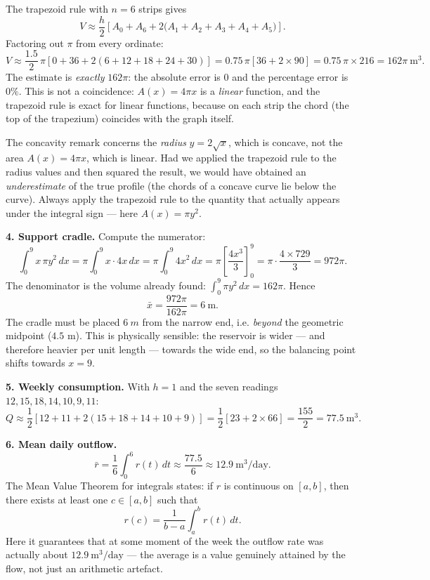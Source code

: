 \documentclass[11pt]{article}
\newcommand{\cle}[1]{{\popxbold\color{popdark}#1}}
\begin{document}
The trapezoid rule with $n=6$ strips gives
\[
V\approx \frac{h}{2}\left[A_0+A_6+2\big(A_1+A_2+A_3+A_4+A_5\big)\right].
\]
Factoring out $\pi$ from every ordinate:
\[
V\approx \frac{1.5}{2}\,\pi\left[0+36+2(6+12+18+24+30)\right]
=0.75\,\pi\left[36+2\times 90\right]
=0.75\,\pi\times 216
=162\pi\ \mathrm{m^3}.
\]
The estimate is \emph{exactly} $162\pi$: the absolute error is $0$ and the percentage error is $0\%$. This is not a coincidence: $A(x)=4\pi x$ is a \emph{linear} function, and the trapezoid rule is exact for linear functions, because on each strip the chord (the top of the trapezium) coincides with the graph itself.

\begin{attention}
The concavity remark concerns the \emph{radius} $y=2\sqrt{x}$, which is concave, not the area $A(x)=4\pi x$, which is linear. Had we applied the trapezoid rule to the radius values and then squared the result, we would have obtained an \emph{underestimate} of the true profile (the chords of a concave curve lie below the curve). Always apply the trapezoid rule to the quantity that actually appears under the integral sign — here $A(x)=\pi y^2$.
\end{attention}

\textbf{4. Support cradle.} Compute the numerator:
\[
\int_0^9 x\,\pi y^2\,dx=\pi\int_0^9 x\cdot 4x\,dx=\pi\int_0^9 4x^2\,dx=\pi\left[\frac{4x^3}{3}\right]_0^9=\pi\cdot\frac{4\times 729}{3}=972\pi.
\]
The denominator is the volume already found: $\displaystyle\int_0^9 \pi y^2\,dx=162\pi$. Hence
\[
\bar{x}=\frac{972\pi}{162\pi}=6\ \mathrm{m}.
\]
The cradle must be placed $\SI{6}{m}$ from the narrow end, i.e. \emph{beyond} the geometric midpoint ($4.5$ m). This is physically sensible: the reservoir is wider — and therefore heavier per unit length — towards the wide end, so the balancing point shifts towards $x=9$.

\textbf{5. Weekly consumption.} With $h=1$ and the seven readings $12,15,18,14,10,9,11$:
\[
Q\approx \frac{1}{2}\left[12+11+2(15+18+14+10+9)\right]
=\frac{1}{2}\left[23+2\times 66\right]
=\frac{155}{2}=77.5\ \mathrm{m^3}.
\]

\textbf{6. Mean daily outflow.}
\[
\bar{r}=\frac{1}{6}\int_0^6 r(t)\,dt\approx\frac{77.5}{6}\approx 12.9\ \mathrm{m^3/day}.
\]
The \cle{Mean Value Theorem for integrals} states: if $r$ is continuous on $[a,b]$, then there exists at least one $c\in[a,b]$ such that
\[
r(c)=\frac{1}{b-a}\int_a^b r(t)\,dt.
\]
Here it guarantees that at some moment of the week the outflow rate was actually about $12.9\ \mathrm{m^3/day}$ — the average is a value genuinely attained by the flow, not just an arithmetic artefact.
\end{document}
